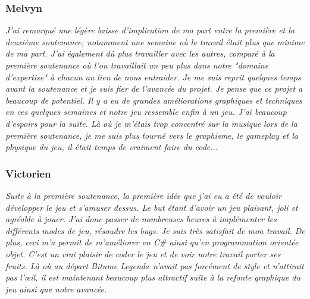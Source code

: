 \documentclass[12pt,a4paper]{article}
\newcommand{\btmlgs}{\textsl{Bitume Legends}}
\begin{document}
            \subsubsection{Melvyn}
                \textit{J'ai remarqué une légère baisse d'implication de ma part entre la 
                première et la deuxième soutenance, notamment une semaine où le 
                travail était plus que minime de ma part. J'ai également dû plus 
                travailler avec les autres, comparé à la première soutenance où l'on
                travaillait un peu plus dans notre "domaine d'expertise" à chacun 
                au lieu de nous entraider. Je me suis reprit quelques temps avant la
                soutenance et je suis fier de l'avancée du projet. Je pense que ce projet
                a beaucoup de potentiel. Il y a eu de grandes améliorations graphiques et
                techniques en ces quelques semaines et notre jeu ressemble enfin à un jeu.
                J'ai beaucoup d'espoirs pour la suite. Là où je m'étais trop concentré sur
                la musique lors de la première soutenance, je me suis plus tourné vers
                le graphisme, le \textsl{gameplay} et la physique du jeu, il était temps de vraiment
                faire du code...}

            \subsubsection{Victorien}
                \textit{Suite à la première soutenance, la première idée que j'ai eu a été
                de vouloir développer le jeu et s'amuser dessus. Le but étant
                d'avoir un jeu plaisant, joli et agréable à jouer. J'ai donc passer
                de nombreuses heures à implémenter les différents modes de jeu, résoudre les 
                \textsl{bugs}. 
                Je suis très satisfait de mon travail. De plus, ceci m'a permit de m'améliorer en 
                \textsl{C\#} ainsi qu'en programmation orientée objet. C'est un vrai plaisir de coder 
                le jeu et de voir notre travail
                porter ses fruits. Là où au départ \btmlgs\, n'avait pas forcément de style et
                n'attirait pas l'œil, il est maintenant beaucoup plus attractif suite à
                la refonte graphique du jeu ainsi que notre avancée.}
\end{document}
